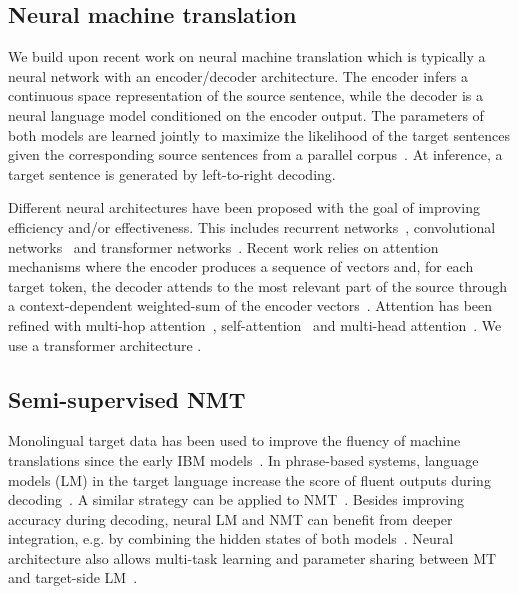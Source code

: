 \documentclass[11pt,a4paper]{article}
\begin{document}
\subsection{Neural machine translation}

We build upon recent work on neural machine translation which is typically a neural network with an encoder/decoder architecture. The encoder infers a continuous space representation of the source sentence, while the decoder is a neural language model conditioned on the encoder output. The parameters of both models are learned jointly to maximize the likelihood of the target sentences given the corresponding source sentences from a parallel corpus~\citep{sutskever:seq2seq:2014,cho:seq2seq:2014}. At inference, a target sentence is generated by left-to-right decoding.

Different neural architectures have been proposed with the goal of improving efficiency and/or effectiveness. This includes recurrent networks~\citep{sutskever:seq2seq:2014,bahdanau:attention:2015,luong:nmt:2015}, convolutional networks~\citep{kalchbrenner:bytenet:2016,gehring:convs2s:2017,kaiser:depthwise:2017} and transformer networks~\citep{vaswani:transformer:2017}. 
Recent work relies on attention mechanisms where the encoder produces a sequence of vectors and, for each target token, the decoder attends to the most relevant part of the source through a context-dependent weighted-sum of the encoder vectors~\citep{bahdanau:attention:2015,luong:nmt:2015}. Attention has been refined with multi-hop attention~\citep{gehring:convs2s:2017}, self-attention~\citep{vaswani:transformer:2017,paulus:summary:2018} and multi-head attention~\citep{vaswani:transformer:2017}.
We use a transformer architecture \citep{vaswani:transformer:2017}.


\subsection{Semi-supervised NMT}

Monolingual target data has been used to improve the fluency of machine translations since the early IBM models~\citep{brown:smt:1990}. In phrase-based systems, language models (LM) in the target language increase the score of fluent outputs during decoding~\citep{koehn:smt:2003,brants:largelm:2007}. A similar strategy can be applied to NMT~\citep{he:nmt_smt:2016}. Besides improving accuracy during decoding, neural LM and NMT can benefit from deeper integration, e.g. by combining the hidden states of both models~\citep{gulcehre:lm:2017}. 
Neural architecture also allows multi-task learning and parameter sharing between MT and target-side LM~\citep{domhan:mtlm:2017}.
\end{document}
